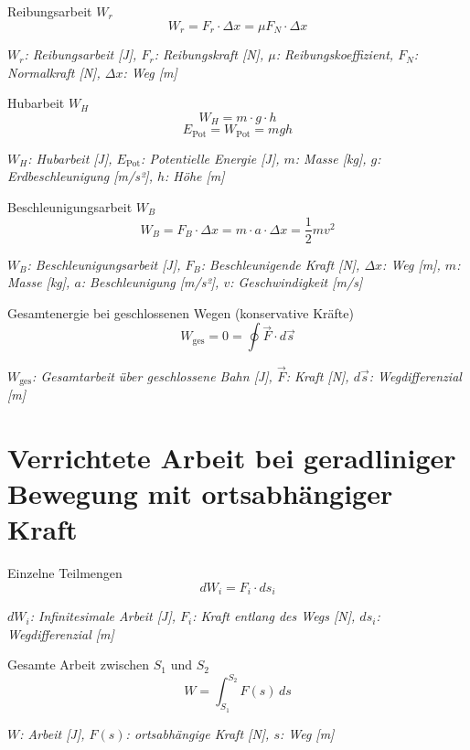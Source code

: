 \documentclass[a5paper,10pt]{article}
\newenvironment{displayformula}
{
	\begin{framed}
		\color{formulaColor}
	}
	{\end{framed}}
\newcommand{\formulalegend}[1]{%
	\par\vspace{0.5ex}%
	{{\color{legendColor}\RaggedRight\small\textit{#1}}}%
	\par\vspace{1.5ex}%
}
\begin{document}
\begin{displayformula}
	Reibungsarbeit \( W_r \)
	\[
	W_r = F_r \cdot \Delta x = \mu F_N \cdot \Delta x
	\]
\end{displayformula}
\formulalegend{
	\( W_r \): Reibungsarbeit [J], \( F_r \): Reibungskraft [N], \( \mu \): Reibungskoeffizient, \( F_N \): Normalkraft [N], \( \Delta x \): Weg [m]
}

\begin{displayformula}
	Hubarbeit \( W_H \)
	\[
	W_H = m \cdot g \cdot h
	\]
	\[
	E_{\text{Pot}} = W_{\text{Pot}} = mgh
	\]
\end{displayformula}
\formulalegend{
	\( W_H \): Hubarbeit [J], \( E_{\text{Pot}} \): Potentielle Energie [J], \( m \): Masse [kg], \( g \): Erdbeschleunigung [m/s²], \( h \): Höhe [m]
}

\begin{displayformula}
	Beschleunigungsarbeit \( W_B \)
	\[
	W_B = F_B \cdot \Delta x = m \cdot a \cdot \Delta x = \frac{1}{2} mv^2
	\]
\end{displayformula}
\formulalegend{
	\( W_B \): Beschleunigungsarbeit [J], \( F_B \): Beschleunigende Kraft [N], \( \Delta x \): Weg [m], \( m \): Masse [kg], \( a \): Beschleunigung [m/s²], \( v \): Geschwindigkeit [m/s]
}

\begin{displayformula}
	Gesamtenergie bei geschlossenen Wegen (konservative Kräfte)
	\[
	W_{\text{ges}} = 0 = \oint \vec{F} \cdot d\vec{s}
	\]
\end{displayformula}
\formulalegend{
	\( W_{\text{ges}} \): Gesamtarbeit über geschlossene Bahn [J], \( \vec{F} \): Kraft [N], \( d\vec{s} \): Wegdifferenzial [m]
}
\newpage
\section{Verrichtete Arbeit bei geradliniger Bewegung mit ortsabhängiger Kraft}

\begin{displayformula}
	Einzelne Teilmengen
	\[
	dW_i = F_i \cdot ds_i
	\]
\end{displayformula}
\formulalegend{
	\( dW_i \): Infinitesimale Arbeit [J], \( F_i \): Kraft entlang des Wegs [N], \( ds_i \): Wegdifferenzial [m]
}

\begin{displayformula}
	Gesamte Arbeit zwischen \( S_1 \) und \( S_2 \)
	\[
	W = \int_{S_1}^{S_2} F(s) \, ds
	\]
\end{displayformula}
\formulalegend{
	\( W \): Arbeit [J], \( F(s) \): ortsabhängige Kraft [N], \( s \): Weg [m]
}
\newpage
\end{document}

